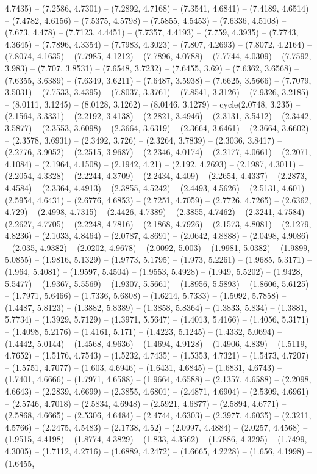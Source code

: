 4.7435) -- (7.2586, 4.7301) -- (7.2892, 4.7168) -- (7.3541, 4.6841) -- (7.4189, 4.6514) -- (7.4782, 4.6156) -- (7.5375, 4.5798) -- (7.5855, 4.5453) -- (7.6336, 4.5108) -- (7.673, 4.478) -- (7.7123, 4.4451) -- (7.7357, 4.4193) -- (7.759, 4.3935) -- (7.7743, 4.3645) -- (7.7896, 4.3354) -- (7.7983, 4.3023) -- (7.807, 4.2693) -- (7.8072, 4.2164) -- (7.8074, 4.1635) -- (7.7985, 4.1212) -- (7.7896, 4.0788) -- (7.7744, 4.0309) -- (7.7592, 3.983) -- (7.707, 3.8531) -- (7.6548, 3.7232) -- (7.6455, 3.69) -- (7.6362, 3.6568) -- (7.6355, 3.6389) -- (7.6349, 3.6211) -- (7.6487, 3.5938) -- (7.6625, 3.5666) -- (7.7079, 3.5031) -- (7.7533, 3.4395) -- (7.8037, 3.3761) -- (7.8541, 3.3126) -- (7.9326, 3.2185) -- (8.0111, 3.1245) -- (8.0128, 3.1262) -- (8.0146, 3.1279) -- cycle(2.0748, 3.235) -- (2.1564, 3.3331) -- (2.2192, 3.4138) -- (2.2821, 3.4946) -- (2.3131, 3.5412) -- (2.3442, 3.5877) -- (2.3553, 3.6098) -- (2.3664, 3.6319) -- (2.3664, 3.6461) -- (2.3664, 3.6602) -- (2.3578, 3.6931) -- (2.3492, 3.726) -- (2.3264, 3.7839) -- (2.3036, 3.8417) -- (2.2776, 3.9052) -- (2.2515, 3.9687) -- (2.2346, 4.0174) -- (2.2177, 4.0661) -- (2.2071, 4.1084) -- (2.1964, 4.1508) -- (2.1942, 4.21) -- (2.192, 4.2693) -- (2.1987, 4.3011) -- (2.2054, 4.3328) -- (2.2244, 4.3709) -- (2.2434, 4.409) -- (2.2654, 4.4337) -- (2.2873, 4.4584) -- (2.3364, 4.4913) -- (2.3855, 4.5242) -- (2.4493, 4.5626) -- (2.5131, 4.601) -- (2.5954, 4.6431) -- (2.6776, 4.6853) -- (2.7251, 4.7059) -- (2.7726, 4.7265) -- (2.6362, 4.729) -- (2.4998, 4.7315) -- (2.4426, 4.7389) -- (2.3855, 4.7462) -- (2.3241, 4.7584) -- (2.2627, 4.7705) -- (2.2248, 4.7816) -- (2.1868, 4.7926) -- (2.1573, 4.8081) -- (2.1279, 4.8236) -- (2.1033, 4.8464) -- (2.0787, 4.8691) -- (2.0642, 4.8888) -- (2.0498, 4.9086) -- (2.035, 4.9382) -- (2.0202, 4.9678) -- (2.0092, 5.003) -- (1.9981, 5.0382) -- (1.9899, 5.0855) -- (1.9816, 5.1329) -- (1.9773, 5.1795) -- (1.973, 5.2261) -- (1.9685, 5.3171) -- (1.964, 5.4081) -- (1.9597, 5.4504) -- (1.9553, 5.4928) -- (1.949, 5.5202) -- (1.9428, 5.5477) -- (1.9367, 5.5569) -- (1.9307, 5.5661) -- (1.8956, 5.5893) -- (1.8606, 5.6125) -- (1.7971, 5.6466) -- (1.7336, 5.6808) -- (1.6214, 5.7333) -- (1.5092, 5.7858) -- (1.4487, 5.8123) -- (1.3882, 5.8389) -- (1.3858, 5.8364) -- (1.3833, 5.834) -- (1.3881, 5.7734) -- (1.3929, 5.7129) -- (1.3971, 5.5647) -- (1.4013, 5.4166) -- (1.4056, 5.3171) -- (1.4098, 5.2176) -- (1.4161, 5.171) -- (1.4223, 5.1245) -- (1.4332, 5.0694) -- (1.4442, 5.0144) -- (1.4568, 4.9636) -- (1.4694, 4.9128) -- (1.4906, 4.839) -- (1.5119, 4.7652) -- (1.5176, 4.7543) -- (1.5232, 4.7435) -- (1.5353, 4.7321) -- (1.5473, 4.7207) -- (1.5751, 4.7077) -- (1.603, 4.6946) -- (1.6431, 4.6845) -- (1.6831, 4.6743) -- (1.7401, 4.6666) -- (1.7971, 4.6588) -- (1.9664, 4.6588) -- (2.1357, 4.6588) -- (2.2098, 4.6643) -- (2.2839, 4.6699) -- (2.3855, 4.6801) -- (2.4871, 4.6904) -- (2.5309, 4.6961) -- (2.5746, 4.7018) -- (2.5834, 4.6948) -- (2.5921, 4.6877) -- (2.5894, 4.6771) -- (2.5868, 4.6665) -- (2.5306, 4.6484) -- (2.4744, 4.6303) -- (2.3977, 4.6035) -- (2.3211, 4.5766) -- (2.2475, 4.5483) -- (2.1738, 4.52) -- (2.0997, 4.4884) -- (2.0257, 4.4568) -- (1.9515, 4.4198) -- (1.8774, 4.3829) -- (1.833, 4.3562) -- (1.7886, 4.3295) -- (1.7499, 4.3005) -- (1.7112, 4.2716) -- (1.6889, 4.2472) -- (1.6665, 4.2228) -- (1.656, 4.1998) -- (1.6455, 